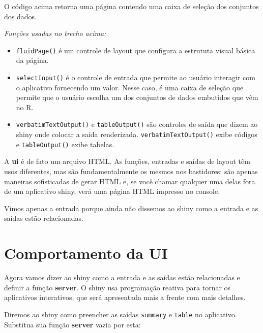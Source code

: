 \documentclass[
]{book}
\begin{document}
O código acima retorna uma página contendo uma caixa de seleção dos conjuntos dos dados.

\emph{Funções usadas no trecho acima:}

\begin{itemize}
\item
  \texttt{fluidPage()} é um controle de layout que configura a estrututa visual básica da página.
\item
  \texttt{selectInput()} é o controle de entrada que permite ao usuário interagir com o aplicativo fornecendo um valor. Nesse caso, é uma caixa de seleção que permite que o usuário escolha um dos conjuntos de dados embutidos que vêm no R.
\item
  \texttt{verbatimTextOutput()} e \texttt{tableOutput()} são controles de saída que dizem ao shiny onde colocar a saída renderizada. \texttt{verbatimTextOutput()} exibe códigos e \texttt{tableOutput()} exibe tabelas.
\end{itemize}

A \textbf{ui} é de fato um arquivo HTML. As funções, entradas e saídas de layout têm usos diferentes, mas são fundamentalmente os mesmos nos bastidores: são apenas maneiras sofisticadas de gerar HTML e, se você chamar qualquer uma delas fora de um aplicativo shiny, verá uma página HTML impresso no console.

Vimos apenas a entrada porque ainda não dissemos ao shiny como a entrada e as saídas estão relacionadas.

\hypertarget{comportamento-da-ui}{%
\section{\texorpdfstring{\textbf{Comportamento da UI}}{Comportamento da UI}}\label{comportamento-da-ui}}

Agora vamos dizer ao shiny como a entrada e as saídas estão relacionadas e definir a função \textbf{server}.
O shiny usa programação reativa para tornar os aplicativos interativos, que será apresentada mais a frente com mais detalhes.

Diremos ao shiny como preencher as saídas \texttt{summary} e \texttt{table} no aplicativo. Substitua sua função \textbf{server} vazia por esta:
\end{document}
